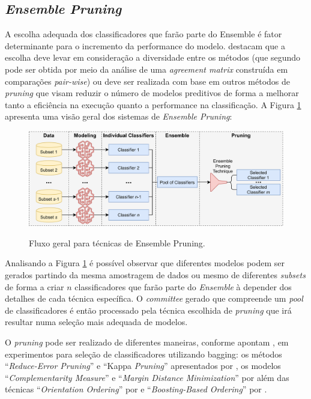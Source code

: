 \subsection{\textit{Ensemble Pruning}}
A escolha adequada dos classificadores que farão parte do Ensemble é fator determinante para o incremento da performance do modelo.  destacam que a escolha deve levar em consideração a diversidade entre os métodos (que segundo  pode ser obtida por meio da análise de uma \textit{agreement matrix} construída em comparações \textit{pair-wise}) ou deve ser realizada com base em outros métodos de \textit{ pruning} que visam reduzir o número de modelos preditivos de forma a melhorar tanto a eficiência na execução quanto a performance na classificação. A Figura \ref{fig:pruning} apresenta uma visão geral dos sistemas de \textit{Ensemble Pruning}:

\begin{figure}[H]
\caption{Fluxo geral para técnicas de Ensemble Pruning. }
\centering
\includegraphics[width=12cm,keepaspectratio]{figs/pruning.png}
\newline {}\label{fig:pruning}
\end{figure}

Analisando a Figura \ref{fig:pruning} é possível observar que diferentes modelos podem ser gerados partindo da mesma amostragem de dados ou mesmo de diferentes \textit{subsets} de forma a criar $n$ classificadores que farão parte do \textit{Ensemble} à depender dos detalhes de cada técnica específica. O \textit{committee} gerado que compreende um \textit{pool} de classificadores é então processado pela técnica escolhida de\textit{ pruning} que irá resultar numa seleção mais adequada de modelos.

O\textit{ pruning} pode ser realizado de diferentes maneiras, conforme apontam , em experimentos para seleção de classificadores utilizando bagging: os métodos ``\textit{Reduce-Error Pruning}'' e ``Kappa \textit{Pruning}'' apresentados por , os modelos ``\textit{Complementarity Measure}'' e ``\textit{Margin Distance Minimization}'' por  além das técnicas ``\textit{Orientation Ordering}'' por  e ``\textit{Boosting-Based Ordering}'' por .

